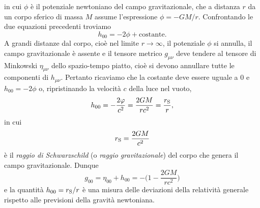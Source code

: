 in cui $\phi$ è il potenziale newtoniano del campo gravitazionale, che a
distanza $r$ da un corpo sferico di massa $M$ assume l'espressione
$\phi = -GM/r$.  Confrontando le due equazioni precedenti troviamo
\begin{equation}
  h_{00} = -2\phi + \text{costante}.
\end{equation}
A grandi distanze dal corpo, cioè nel limite $r \to \infty$, il potenziale
$\phi$ si annulla, il campo gravitazionale è assente e il tensore metrico
$g_{\mu\nu}$ deve tendere al tensore di Minkowski $\eta_{\mu\nu}$ dello
spazio-tempo piatto, cioè si devono annullare tutte le componenti di
$h_{\mu\nu}$.  Pertanto ricaviamo che la costante deve essere uguale a $0$ e
$h_{00} = -2\phi$ o, ripristinando la velocità $c$ della luce  nel vuoto,
\begin{equation}
  \label{eq:h00}
  h_{00} = -\frac{2\phi}{c^{2}} = \frac{2GM}{rc^{2}} = \frac{r_{\textup{S}}}{r},
\end{equation}
in cui
\begin{equation}
  r_{\textup{S}} = \frac{2GM}{c^{2}}
\end{equation}
è il \emph{raggio di Schwarzschild} (o
\emph{raggio gravitazionale}) del corpo che genera il campo gravitazionale.
Dunque
\begin{equation}
  g_{00} = \eta_{00} + h_{00} = - \bigg(1 - \frac{2GM}{rc^{2}} \bigg)
\end{equation}
e la quantità $h_{00} = r_{\textup{S}}/r$ è una misura delle deviazioni della
relatività generale rispetto alle previsioni della gravità newtoniana.

